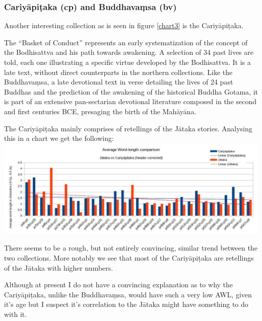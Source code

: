 \subsubsection{Cariyāpiṭaka (cp) and Buddhavaṃsa (bv)}
Another interesting collection as is seen in figure \ref{chart3} is the Cariyāpiṭaka. 

The “Basket of Conduct” represents an early systematization of the concept of the Bodhisattva and his path towards awakening. A selection of 34 past lives are told, each one illustrating a specific virtue developed by the Bodhisattva. It is a late text, without direct counterparts in the northern collections. Like the Buddhavaṃsa, a late devotional text in verse detailing the lives of 24 past Buddhas and the prediction of the awakening of the historical Buddha Gotama, it is part of an extensive pan-sectarian devotional literature composed in the second and first centuries BCE, presaging the birth of the Mahāyāna.

The Cariyāpiṭaka mainly comprises of retellings of the Jātaka stories. Analysing this in a chart we get the following:\\

\includegraphics[width=\linewidth]{jacp.jpg}
\label{jacp}

\medskip
There seems to be a rough, but not entirely convincing, similar trend between the two collections. More notably we see that most of the Cariyāpiṭaka are retellings of the Jātaka with higher numbers. 

Although at present I do not have a convincing explanation as to why the Cariyāpiṭaka, unlike the Buddhavaṃsa, would have such a very low AWL, given it's age but I suspect it's correlation to the Jātaka might have something to do with it.\\

